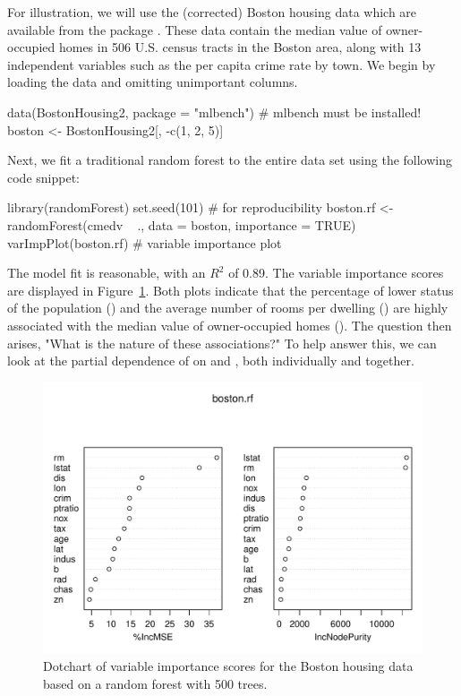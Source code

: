 For illustration, we will use the (corrected) Boston housing data which are available from the  package \citep{mlbench-pkg}. These data contain the median value of owner-occupied homes in 506 U.S. census tracts in the Boston area, along with 13 independent variables such as the per capita crime rate by town. We begin by loading the data and omitting unimportant columns.
\begin{example}
data(BostonHousing2, package = "mlbench")  # mlbench must be installed!
boston <- BostonHousing2[, -c(1, 2, 5)]
\end{example}
Next, we fit a traditional random forest to the entire data set using the following code snippet:
\begin{example}
library(randomForest)
set.seed(101)  # for reproducibility
boston.rf <- randomForest(cmedv ~ ., data = boston, importance = TRUE)
varImpPlot(boston.rf)  # variable importance plot
\end{example}
The model fit is reasonable, with an  $R^2$ of 0.89. The variable importance scores are displayed in Figure~\ref{fig:plotmo_vs_partial}. Both plots indicate that the percentage of lower status of the population () and the average number of rooms per dwelling () are highly associated with the median value of owner-occupied homes (). The question then arises, "What is the nature of these associations?" To help answer this, we can look at the partial dependence of  on  and , both individually and together.

\begin{figure}[htbp]
  \centering
  \includegraphics[width=1.0\linewidth]{boston_rf_vimp}
  \caption{Dotchart of variable importance scores for the Boston housing data based on a random forest with 500 trees.}
  \label{fig:plotmo_vs_partial}
\end{figure}


